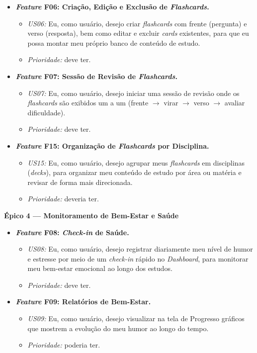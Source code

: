 \begin{itemize}
    \item \textbf{\textit{Feature} F06: Criação, Edição e Exclusão de \textit{Flashcards}.}
    \begin{itemize}
        \item \textit{US06:} Eu, como usuário, desejo criar \textit{flashcards} com frente (pergunta) e verso (resposta), bem como editar e excluir \textit{cards} existentes, para que eu possa montar meu próprio banco de conteúdo de estudo.
        \item \textit{Prioridade:} deve ter.
    \end{itemize}
    \item \textbf{\textit{Feature} F07: Sessão de Revisão de \textit{Flashcards}.}
    \begin{itemize}
        \item \textit{US07:} Eu, como usuário, desejo iniciar uma sessão de revisão onde os \textit{flashcards} são exibidos um a um (frente $\rightarrow$ virar $\rightarrow$ verso $\rightarrow$ avaliar dificuldade).
        \item \textit{Prioridade:} deve ter.
    \end{itemize}
    \item \textbf{\textit{Feature} F15: Organização de \textit{Flashcards} por Disciplina.}
    \begin{itemize}
        \item \textit{US15:} Eu, como usuário, desejo agrupar meus \textit{flashcards} em disciplinas (\textit{decks}), para organizar meu conteúdo de estudo por área ou matéria e revisar de forma mais direcionada.
        \item \textit{Prioridade:} deveria ter.
    \end{itemize}
\end{itemize}

\textbf{Épico 4 --- Monitoramento de Bem-Estar e Saúde}

\begin{itemize}
    \item \textbf{\textit{Feature} F08: \textit{Check-in} de Saúde.}
    \begin{itemize}
        \item \textit{US08:} Eu, como usuário, desejo registrar diariamente meu nível de humor e estresse por meio de um \textit{check-in} rápido no \textit{Dashboard}, para monitorar meu bem-estar emocional ao longo dos estudos.
        \item \textit{Prioridade:} deve ter.
    \end{itemize}
    \item \textbf{\textit{Feature} F09: Relatórios de Bem-Estar.}
    \begin{itemize}
        \item \textit{US09:} Eu, como usuário, desejo visualizar na tela de Progresso gráficos que mostrem a evolução do meu humor ao longo do tempo.
        \item \textit{Prioridade:} poderia ter.
    \end{itemize}
\end{itemize}

